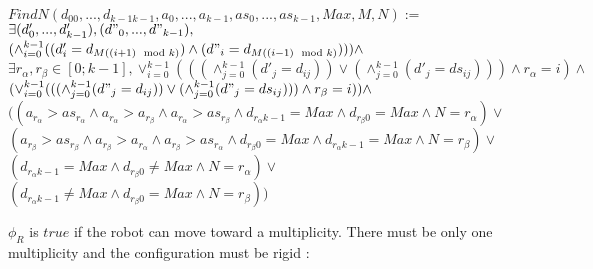 \documentclass{article}
\begin{document}
\begin{center}

$FindN(d_{00}, ...,d_{k-1k-1}, a_{0}, ..., a_{k-1}, as_{0}, ..., as_{k-1}, Max, M, N):=$\\
$\exists (d'_{0}, ..., d'_{k-1}), (d"_{0}, ..., d"_{k-1}),$\\
$(\land_{i=0}^{k-1} ((d'_{i} = d_{M((i+1)\mod{k})}) \land (d"_{i} = d_{M((i-1)\mod{k})}))) \land$\\
$\exists r_{\alpha}, r_{\beta} \in [0; k-1], \lor_{i=0}^{k-1}(((\land_{j=0}^{k-1}(d'_{j} = d_{ij})) \lor
(\land_{j=0}^{k-1}(d'_{j} = ds_{ij}) ))
\land r_{\alpha} = i )\land$\\
$(\lor_{i=0}^{k-1}(((\land_{j=0}^{k-1}(d"_{j} = d_{ij})) \lor
(\land_{j=0}^{k-1}(d"_{j} = ds_{ij}) ))
\land r_{\beta} = i )) \land$\\
$((a_{r_\alpha} > as_{r_\alpha} \land a_{r_\alpha} > a_{r_\beta} \land a_{r_\alpha} > as_{r_\beta}
\land d_{r_{\alpha}k-1} = Max \land d_{r_{\beta}0} = Max
\land N = r_{\alpha}) \lor$\\
$(a_{r_\beta} > as_{r_\beta} \land a_{r_\beta} > a_{r_\alpha} \land a_{r_\beta} > as_{r_\alpha} 
\land d_{r_{\beta}0} = Max \land d_{r_{\alpha}k-1} = Max
\land N = r_{\beta}) \lor$\\
$(d_{r_{\alpha}k-1} = Max \land d_{r_{\beta}0} \not= Max \land N = r_{\alpha}) \lor$\\
$(d_{r_{\alpha}k-1} \not= Max \land d_{r_{\beta}0} = Max \land N = r_{\beta}))$
\end{center}

$\phi_R$ is $true$ if the robot can move toward a multiplicity. There must be only one multiplicity and the configuration must be rigid :
\end{document}

